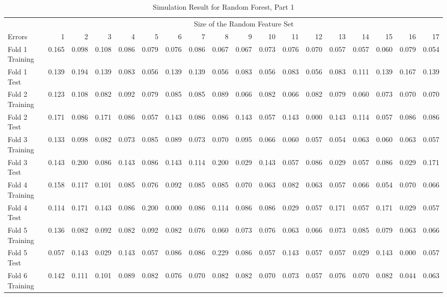 \documentclass[12pt,oneside,a4paper]{article}
\begin{document}
\begin{landscape}
\begin{table}[ht]
\centering
\caption{Simulation Result for Random Forest, Part 1}
\begin{tabular}{lrrrrrrrrrrrrrrrrr}
  \toprule
 & \multicolumn{17}{c}{Size of the Random Feature Set}\\
 \cmidrule[0.05em]{2-18}
Errors & 1 & 2 & 3 & 4 & 5 & 6 & 7 & 8 & 9 & 10 & 11 & 12 & 13 & 14 & 15 & 16 & 17 \\
  \midrule
Fold 1 Training & 0.165 & 0.098 & 0.108 & 0.086 & 0.079 & 0.076 & 0.086 & 0.067 & 0.067 & 0.073 & 0.076 & 0.070 & 0.057 & 0.057 & 0.060 & 0.079 & 0.054 \\
  Fold 1 Test & 0.139 & 0.194 & 0.139 & 0.083 & 0.056 & 0.139 & 0.139 & 0.056 & 0.083 & 0.056 & 0.083 & 0.056 & 0.083 & 0.111 & 0.139 & 0.167 & 0.139 \\
  Fold 2 Training & 0.123 & 0.108 & 0.082 & 0.092 & 0.079 & 0.085 & 0.085 & 0.089 & 0.066 & 0.082 & 0.066 & 0.082 & 0.079 & 0.060 & 0.073 & 0.070 & 0.070 \\
  Fold 2 Test & 0.171 & 0.086 & 0.171 & 0.086 & 0.057 & 0.143 & 0.086 & 0.086 & 0.143 & 0.057 & 0.143 & 0.000 & 0.143 & 0.114 & 0.057 & 0.086 & 0.086 \\
  Fold 3 Training & 0.133 & 0.098 & 0.082 & 0.073 & 0.085 & 0.089 & 0.073 & 0.070 & 0.095 & 0.066 & 0.060 & 0.057 & 0.054 & 0.063 & 0.060 & 0.063 & 0.057 \\
  Fold 3 Test & 0.143 & 0.200 & 0.086 & 0.143 & 0.086 & 0.143 & 0.114 & 0.200 & 0.029 & 0.143 & 0.057 & 0.086 & 0.029 & 0.057 & 0.086 & 0.029 & 0.171 \\
  Fold 4 Training & 0.158 & 0.117 & 0.101 & 0.085 & 0.076 & 0.092 & 0.085 & 0.085 & 0.070 & 0.063 & 0.082 & 0.063 & 0.057 & 0.066 & 0.054 & 0.070 & 0.066 \\
  Fold 4 Test & 0.114 & 0.171 & 0.143 & 0.086 & 0.200 & 0.000 & 0.086 & 0.114 & 0.086 & 0.086 & 0.029 & 0.057 & 0.171 & 0.057 & 0.171 & 0.029 & 0.057 \\
  Fold 5 Training & 0.136 & 0.082 & 0.092 & 0.082 & 0.092 & 0.082 & 0.076 & 0.060 & 0.073 & 0.076 & 0.063 & 0.066 & 0.073 & 0.085 & 0.079 & 0.063 & 0.066 \\
  Fold 5 Test & 0.057 & 0.143 & 0.029 & 0.143 & 0.057 & 0.086 & 0.086 & 0.229 & 0.086 & 0.057 & 0.143 & 0.057 & 0.057 & 0.029 & 0.143 & 0.000 & 0.057 \\
  Fold 6 Training & 0.142 & 0.111 & 0.101 & 0.089 & 0.082 & 0.076 & 0.070 & 0.082 & 0.082 & 0.070 & 0.073 & 0.057 & 0.076 & 0.070 & 0.082 & 0.044 & 0.063 \\

\end{tabular}
\end{table}
\end{landscape}
\end{document}
